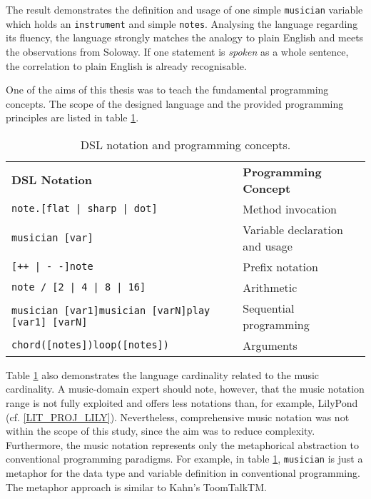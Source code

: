 The result demonstrates the definition and usage of one simple \texttt{musician} variable which holds an \texttt{instrument} and simple \texttt{notes}. Analysing the language regarding its fluency, the language strongly matches the analogy to plain English and meets the observations from Soloway.\cite{Soloway1982} If one statement is \textit{spoken} as a whole sentence, the correlation to plain English is already recognisable.

One of the aims of this thesis was to teach the fundamental programming concepts. The scope of the designed language and the provided programming principles are listed in table \ref{TBL_DSL_TEACHING}.

\begin{table}[h]
\caption{DSL notation and programming concepts.}
\label{TBL_DSL_TEACHING}
\begin{tabular}{p{200pt}|p{180pt}}
\rowcolor{htwg-teal} 
\textbf{DSL Notation}                  			& \textbf{Programming Concept}     \\
\texttt{note.[flat | sharp | dot]}            & Method invocation \\
\texttt{musician [var]}                   		& Variable declaration and usage \\
\texttt{[++ | - -]note}                    			& Prefix notation \\
\texttt{note / [2 | 4 | 8 | 16]}                 & Arithmetic \\
\texttt{musician [var1]}\newline\texttt{musician [varN]}\newline\texttt{play [var1] [varN]}		& Sequential programming \\
\texttt{chord([notes])}\newline\texttt{loop([notes])}  							& Arguments
\end{tabular}
\end{table}

Table \ref{TBL_DSL_TEACHING} also demonstrates the language cardinality related to the music cardinality. A music-domain expert should note, however, that the music notation range is not fully exploited and offers less notations than, for example, LilyPond (cf. \ref{LIT_PROJ_LILY}). Nevertheless, comprehensive music notation was not within the scope of this study, since the aim was to reduce complexity. Furthermore, the music notation represents only the metaphorical abstraction to conventional programming paradigms. For example, in table \ref{TBL_DSL_TEACHING}, \texttt{musician} is just a metaphor for the data type and variable definition in conventional programming. The metaphor approach is similar to Kahn's ToomTalkTM.\cite{Kahn1995}

